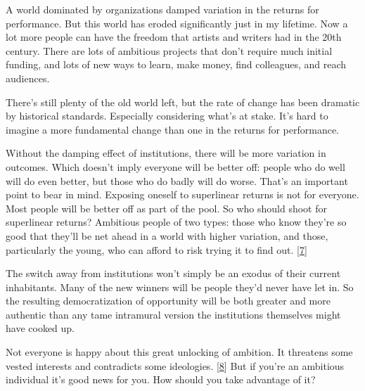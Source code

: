 A world dominated by organizations damped
                  variation in the returns for performance. But this world has
                  eroded significantly just in my lifetime. Now a lot more
                  people can have the freedom that artists and writers had in
                  the 20th century. There are lots of ambitious projects that
                  don't require much initial funding, and lots of new ways to
                  learn, make money, find colleagues, and reach audiences.

There's
                  still plenty of the old world left, but the rate of change has
                  been dramatic by historical standards. Especially considering
                  what's at stake. It's hard to imagine a more fundamental
                  change than one in the returns for performance.

Without
                  the damping effect of institutions, there will be more
                  variation in outcomes. Which doesn't imply everyone will be
                  better off: people who do well will do even better, but those
                  who do badly will do worse. That's an important point to bear
                  in mind. Exposing oneself to superlinear returns is not for
                  everyone. Most people will be better off as part of the pool.
                  So who should shoot for superlinear returns? Ambitious people
                  of two types: those who know they're so good that they'll be
                  net ahead in a world with higher variation, and those,
                  particularly the young, who can afford to risk trying it to
                  find out.
                  [\href{\#f7n}{7}]

The switch away from institutions won't simply be
                  an exodus of their current inhabitants. Many of the new
                  winners will be people they'd never have let in. So the
                  resulting democratization of opportunity will be both greater
                  and more authentic than any tame intramural version the
                  institutions themselves might have cooked up.






                  Not everyone is happy about this great unlocking of ambition.
                  It threatens some vested interests and contradicts some
                  ideologies. [\href{\#f8n}{8}]
                  But if you're an ambitious individual it's good news for you.
                  How should you take advantage of it?

